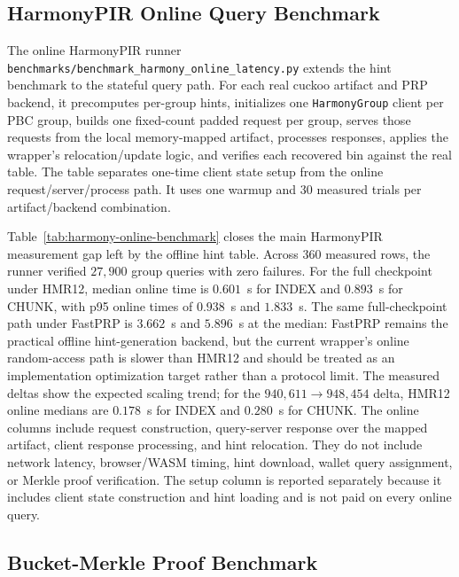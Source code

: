 \subsection{HarmonyPIR Online Query Benchmark}

The online HarmonyPIR runner \texttt{benchmarks/benchmark\_harmony\_online\_latency.py} extends the hint benchmark to the stateful query path. For each real cuckoo artifact and PRP backend, it precomputes per-group hints, initializes one \texttt{HarmonyGroup} client per PBC group, builds one fixed-count padded request per group, serves those requests from the local memory-mapped artifact, processes responses, applies the wrapper's relocation/update logic, and verifies each recovered bin against the real table. The table separates one-time client state setup from the online request/server/process path. It uses one warmup and 30 measured trials per artifact/backend combination.



Table~\ref{tab:harmony-online-benchmark} closes the main HarmonyPIR measurement gap left by the offline hint table. Across 360 measured rows, the runner verified $27{,}900$ group queries with zero failures. For the full checkpoint under HMR12, median online time is $0.601$~s for INDEX and $0.893$~s for CHUNK, with p95 online times of $0.938$~s and $1.833$~s. The same full-checkpoint path under FastPRP is $3.662$~s and $5.896$~s at the median: FastPRP remains the practical offline hint-generation backend, but the current wrapper's online random-access path is slower than HMR12 and should be treated as an implementation optimization target rather than a protocol limit. The measured deltas show the expected scaling trend; for the $940{,}611 \to 948{,}454$ delta, HMR12 online medians are $0.178$~s for INDEX and $0.280$~s for CHUNK. The online columns include request construction, query-server response over the mapped artifact, client response processing, and hint relocation. They do not include network latency, browser/WASM timing, hint download, wallet query assignment, or Merkle proof verification. The setup column is reported separately because it includes client state construction and hint loading and is not paid on every online query.

\subsection{Bucket-Merkle Proof Benchmark}

